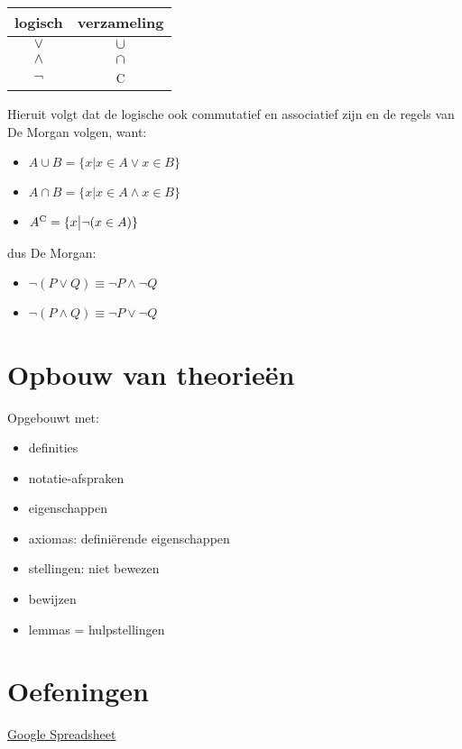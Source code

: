 \documentclass{article}
\begin{document}
\begin{center}
    \begin{tabular}{|c|c|}
    \hline
    logisch & verzameling \\
    \hline
    $\lor$ & $\cup$\\
    $\land$ & $\cap$\\
    $\neg$ & \textsuperscript{C}\\
    \hline
    \end{tabular}
\end{center}
Hieruit volgt dat de logische ook commutatief en associatief zijn en de regels van De Morgan volgen, want:
\begin{itemize}
    \item $A \cup B = \{x \big| x \in A \lor x\in B\}$
    \item $A \cap B = \{x \big| x \in A \land x\in B\}$
    \item $A\textsuperscript{C} = \{x \big| \neg(x \in A)\}$
\end{itemize}
dus De Morgan:
\begin{itemize}
    \item $\neg(P \lor Q) \equiv \neg P \land \neg Q$
    \item $\neg(P \land Q) \equiv \neg P \lor \neg Q$
\end{itemize}
\section{Opbouw van theorieën}
Opgebouwt met:
\begin{itemize}
    \item definities
    \item notatie-afspraken
    \item eigenschappen
    \item axiomas: definiërende eigenschappen
    \item stellingen: niet bewezen
    \item bewijzen
    \item lemmas = hulpstellingen
\end{itemize}

\section{Oefeningen}
\href{https://docs.google.com/spreadsheets/d/1thtWaGEHPFeVuYDWK-XKuEimLSO2Zc_yDwdODAbYIok/edit#gid=0}{Google Spreadsheet}
\end{document}
